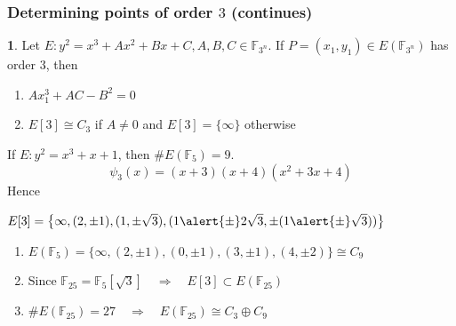 \documentclass[10pt,final]{beamer} %
\newcommand{\F}{\mathbb F}
\theoremstyle{definition}
\newtheorem{Note}[theorem]{\translate{Note}}
\begin{document}
\begin{frame}\frametitle{Determining points of order $3$ (continues)}

\begin{Note} Let $E: y^2=x^3+Ax^2+Bx+C, A,B,C\in\F_{3^n}$. If $P=(x_1,y_1)\in E(\F_{3^n})$
has order $3$, then
\begin{enumerate}[<+-| alert@+>]
 \item $Ax_1^3+AC-B^2=0$
 \item $E[3]\cong C_3$ if $A\neq0$ and $E[3]=\{\infty\}$ otherwise
\end{enumerate}
\end{Note}\pause

\begin{example}
If $E: y^2=x^3+x+1$, then $\#E(\F_5)=9$.\pause
$$\psi_3(x)=(x + 3)(x + 4)(x^2 + 3x + 4)$$
Hence
\centerline{$E[3]=\left\{
\infty,(2,\pm1),(1,\pm\sqrt{3}),(1\alert{\pm}2\sqrt{3},\pm(1\alert{\pm}\sqrt{3}))\right\}$}\pause
\begin{enumerate}[<+-| alert@+>]
 \item $E(\F_5)=\{\infty,(2,\pm1),(0,\pm1),(3,\pm1),(4,\pm2)\}\cong C_9$
 \item Since $\F_{25}=\F_5[\sqrt{3}]\quad\Rightarrow\quad  E[3]\subset E(\F_{25})$
 \item $\#E(\F_{25})=27\quad\Rightarrow\quad E(\F_{25})\cong C_3\oplus C_9$
\end{enumerate}


\end{example}
\end{frame}
\end{document}
